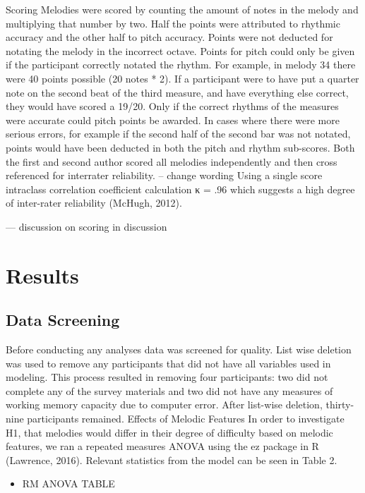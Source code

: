 \documentclass[]{book}
\providecommand{\tightlist}{%
  \setlength{\itemsep}{0pt}\setlength{\parskip}{0pt}}
\begin{document}
Scoring Melodies were scored by counting the amount of notes in the melody and multiplying that number by two.
Half the points were attributed to rhythmic accuracy and the other
half to pitch accuracy.
Points were not deducted for notating the melody in the incorrect octave.
Points for pitch could only be given if the participant correctly notated the rhythm.
For example, in melody 34 there were 40 points possible (20 notes * 2).
If a participant were to have put a quarter note on the second beat of the third measure, and have everything else correct, they would have scored a 19/20.
Only if the correct rhythms of the measures were accurate could pitch points be
awarded.
In cases where there were more serious errors, for example if the second half of the second bar was not notated, points would have been deducted in both the pitch and rhythm sub-scores.
Both the first and second author scored all melodies independently and then cross referenced for interrater
reliability. -- change wording
Using a single score intraclass correlation coefficient calculation κ = .96 which suggests a high degree of inter-rater reliability (McHugh, 2012).

--- discussion on scoring in discussion

\hypertarget{results-1}{%
\section{Results}\label{results-1}}

\hypertarget{data-screening}{%
\subsection{Data Screening}\label{data-screening}}

Before conducting any analyses data was screened for quality.
List wise deletion was used to remove any participants that did not have all variables used in modeling.
This process resulted in removing four participants: two did not complete any of the survey materials and two did not have any measures of working memory capacity due to computer error.
After list-wise deletion, thirty-nine participants remained.
Effects of Melodic Features In order to investigate H1, that melodies would differ in their degree of difficulty based on melodic features, we ran a repeated measures ANOVA using the ez package in R (Lawrence, 2016).
Relevant statistics from the model can be seen in Table 2.

\begin{itemize}
\tightlist
\item
  RM ANOVA TABLE
\end{itemize}
\end{document}
